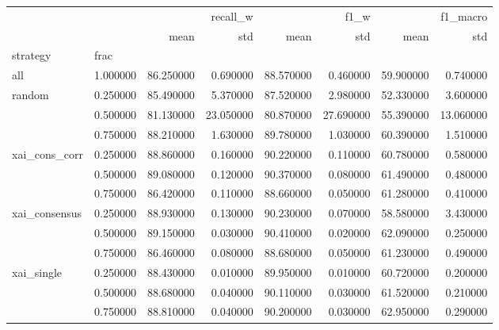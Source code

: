 \begin{tabular}{llrrrrrr}
\toprule
 &  & \multicolumn{2}{r}{recall_w} & \multicolumn{2}{r}{f1_w} & \multicolumn{2}{r}{f1_macro} \\
 &  & mean & std & mean & std & mean & std \\
strategy & frac &  &  &  &  &  &  \\
\midrule
all & 1.000000 & 86.250000 & 0.690000 & 88.570000 & 0.460000 & 59.900000 & 0.740000 \\
\cline{1-8}
\multirow[t]{3}{*}{random} & 0.250000 & 85.490000 & 5.370000 & 87.520000 & 2.980000 & 52.330000 & 3.600000 \\
 & 0.500000 & 81.130000 & 23.050000 & 80.870000 & 27.690000 & 55.390000 & 13.060000 \\
 & 0.750000 & 88.210000 & 1.630000 & 89.780000 & 1.030000 & 60.390000 & 1.510000 \\
\cline{1-8}
\multirow[t]{3}{*}{xai_cons_corr} & 0.250000 & 88.860000 & 0.160000 & 90.220000 & 0.110000 & 60.780000 & 0.580000 \\
 & 0.500000 & 89.080000 & 0.120000 & 90.370000 & 0.080000 & 61.490000 & 0.480000 \\
 & 0.750000 & 86.420000 & 0.110000 & 88.660000 & 0.050000 & 61.280000 & 0.410000 \\
\cline{1-8}
\multirow[t]{3}{*}{xai_consensus} & 0.250000 & 88.930000 & 0.130000 & 90.230000 & 0.070000 & 58.580000 & 3.430000 \\
 & 0.500000 & 89.150000 & 0.030000 & 90.410000 & 0.020000 & 62.090000 & 0.250000 \\
 & 0.750000 & 86.460000 & 0.080000 & 88.680000 & 0.050000 & 61.230000 & 0.490000 \\
\cline{1-8}
\multirow[t]{3}{*}{xai_single} & 0.250000 & 88.430000 & 0.010000 & 89.950000 & 0.010000 & 60.720000 & 0.200000 \\
 & 0.500000 & 88.680000 & 0.040000 & 90.110000 & 0.030000 & 61.520000 & 0.210000 \\
 & 0.750000 & 88.810000 & 0.040000 & 90.200000 & 0.030000 & 62.950000 & 0.290000 \\
\cline{1-8}
\bottomrule
\end{tabular}

